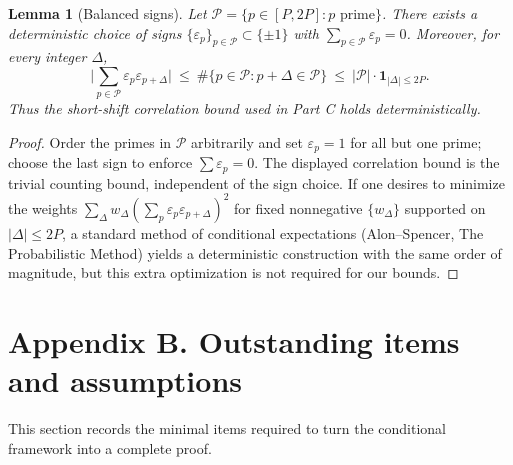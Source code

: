 \documentclass[11pt]{article}
\newtheorem{lemma}{Lemma}[section]
\theoremstyle{definition}
\theoremstyle{remark}
\begin{document}
\begin{lemma}[Balanced signs]\label{lem:balanced-signs}
	Let $\mathcal P=\{p\in[P,2P]: p\text{ prime}\}$. There exists a deterministic choice of signs $\{\varepsilon_p\}_{p\in\mathcal P}\subset\{\pm 1\}$ with $\sum_{p\in\mathcal P}\varepsilon_p=0$. Moreover, for every integer $\Delta$,
	\[
		\Big|\sum_{p\in\mathcal P}\varepsilon_p\varepsilon_{p+\Delta}\Big|\ \le\ \#\{p\in\mathcal P: p+\Delta\in\mathcal P\}\ \le\ |\mathcal P|\cdot \mathbf 1_{|\Delta|\le 2P}.
	\]
	Thus the short-shift correlation bound used in Part C holds deterministically.
\end{lemma}

\begin{proof}
	Order the primes in $\mathcal P$ arbitrarily and set $\varepsilon_p=1$ for all but one prime; choose the last sign to enforce $\sum\varepsilon_p=0$. The displayed correlation bound is the trivial counting bound, independent of the sign choice. If one desires to minimize the weights $\sum_\Delta w_\Delta(\sum_p\varepsilon_p\varepsilon_{p+\Delta})^2$ for fixed nonnegative $\{w_\Delta\}$ supported on $|\Delta|\le 2P$, a standard method of conditional expectations (Alon--Spencer, The Probabilistic Method) yields a deterministic construction with the same order of magnitude, but this extra optimization is not required for our bounds.
\end{proof}

\bigskip

\appendix
\section*{Appendix B. Outstanding items and assumptions}

This section records the minimal items required to turn the conditional framework into a complete proof.
\end{document}
